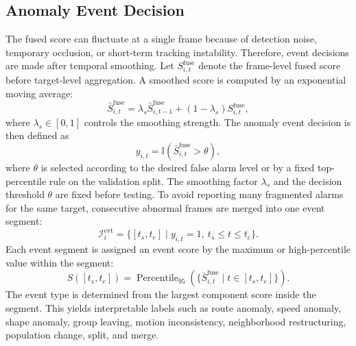 \subsection{Anomaly Event Decision}
The fused score can fluctuate at a single frame because of detection noise, temporary occlusion, or short-term tracking instability. Therefore, event decisions are made after temporal smoothing. Let \(S_{i,t}^{\mathrm{fuse}}\) denote the frame-level fused score before target-level aggregation. A smoothed score is computed by an exponential moving average:
\begin{equation}
  \bar{S}_{i,t}^{\mathrm{fuse}}
  =
  \lambda_s\bar{S}_{i,t-1}^{\mathrm{fuse}}
  +
  (1-\lambda_s)S_{i,t}^{\mathrm{fuse}},
\end{equation}
where \(\lambda_s\in[0,1]\) controls the smoothing strength. The anomaly event decision is then defined as
\begin{equation}
  y_{i,t}
  =
  \mathbb{I}\left(
  \bar{S}_{i,t}^{\mathrm{fuse}}>\theta
  \right),
\end{equation}
where \(\theta\) is selected according to the desired false alarm level or by a fixed top-percentile rule on the validation split. The smoothing factor \(\lambda_s\) and the decision threshold \(\theta\) are fixed before testing. To avoid reporting many fragmented alarms for the same target, consecutive abnormal frames are merged into one event segment:
\begin{equation}
  \mathcal{I}_i^{\mathrm{evt}} =
  \{[t_s,t_e]\mid y_{i,t}=1,\ t_s\leq t\leq t_e\}.
\end{equation}
Each event segment is assigned an event score by the maximum or high-percentile value within the segment:
\begin{equation}
  S([t_s,t_e])
  =
  \operatorname{Percentile}_{95}
  \left(
  \{\bar{S}_{i,t}^{\mathrm{fuse}}\mid t\in[t_s,t_e]\}
  \right).
\end{equation}
The event type is determined from the largest component score inside the segment. This yields interpretable labels such as route anomaly, speed anomaly, shape anomaly, group leaving, motion inconsistency, neighborhood restructuring, population change, split, and merge.

